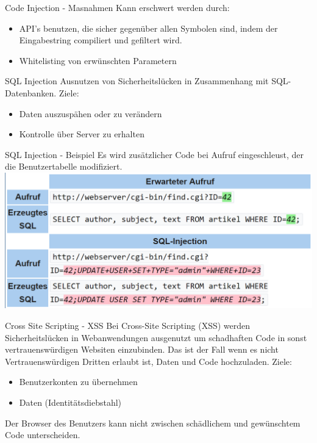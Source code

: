 \documentclass[10pt]{beamer}
\begin{document}
\begin{frame}[fragile]{Code Injection - Masnahmen}
  Kann erschwert werden durch:
  \begin{itemize}
    \item API's benutzen, die sicher gegen\"uber allen Symbolen sind, indem der Eingabestring compiliert und gefiltert wird.
    \item Whitelisting von erw\"unschten Parametern
  \end{itemize}
\end{frame}

\begin{frame}[fragile]{SQL Injection}
  Ausnutzen von Sicherheitsl\"ucken in Zusammenhang mit SQL-Datenbanken.
  Ziele:
  \begin{itemize}
    \item Daten auszusp\"ahen oder zu ver\"andern
    \item Kontrolle \"uber Server zu erhalten
  \end{itemize}
\end{frame}

\begin{frame}[fragile]{SQL Injection - Beispiel}
  Es wird zus\"atzlicher Code bei Aufruf eingeschleust, der die Benutzertabelle modifiziert.
  \newline
  \includegraphics[scale=0.5]{sql_injection_1}
\end{frame}

\begin{frame}[fragile]{Cross Site Scripting - XSS}
  Bei Cross-Site Scripting (XSS) werden Sicherheitsl\"ucken in Webanwendungen ausgenutzt um schadhaften Code in sonst vertrauensw\"urdigen Websiten einzubinden.
  Das ist der Fall wenn es nicht Vertrauensw\"urdigen Dritten erlaubt ist, Daten und Code hochzuladen.
  \newline
  Ziele:
  \begin{itemize}
    \item Benutzerkonten zu \"ubernehmen
    \item Daten (Identit\"atsdiebstahl)
  \end{itemize}
  Der Browser des Benutzers kann nicht zwischen sch\"adlichem und gew\"unschtem Code unterscheiden.
\end{frame}
\end{document}
